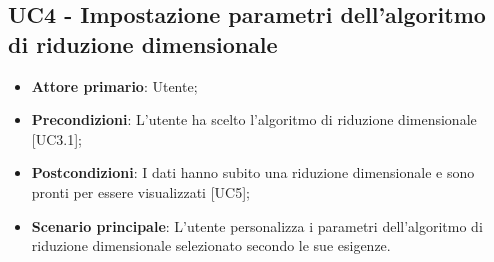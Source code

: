 \subsection{UC4 - Impostazione parametri dell'algoritmo di riduzione dimensionale}
\begin{itemize}
	\item \textbf{Attore primario}: Utente;
	\item \textbf{Precondizioni}: L'utente ha scelto l'algoritmo di riduzione dimensionale [UC3.1];
	\item \textbf{Postcondizioni}: I dati hanno subito una riduzione dimensionale e sono pronti per essere visualizzati [UC5];
	\item \textbf{Scenario principale}: L'utente personalizza i parametri dell'algoritmo di riduzione dimensionale selezionato secondo le sue esigenze.
\end{itemize}